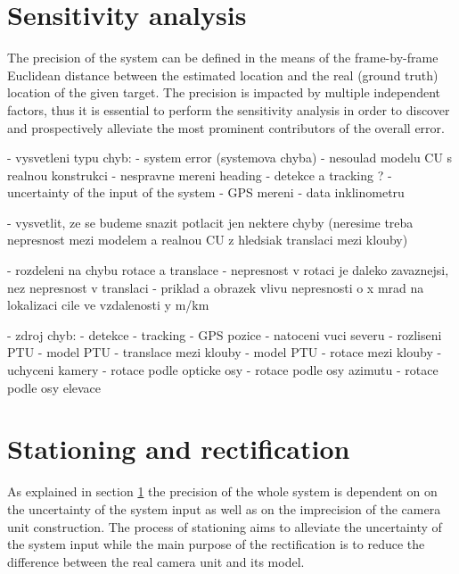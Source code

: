 \chapter{Sensitivity analysis} \label{txt:sensitivity_analysis}
The precision of the system can be defined in the means of the frame-by-frame Euclidean distance between the estimated location and the real (ground truth) location of the given target. The precision is impacted by multiple independent factors, thus it is essential to perform the sensitivity analysis in order to discover and prospectively alleviate the most prominent contributors of the overall error. 

- vysvetleni typu chyb:
	- system error (systemova chyba)
		- nesoulad modelu CU s realnou konstrukci
		- nespravne mereni heading
		- detekce a tracking ?
	- uncertainty of the input of the system
		- GPS mereni
		- data inklinometru
	
- vysvetlit, ze se budeme snazit potlacit jen nektere chyby (neresime treba nepresnost mezi modelem a realnou CU z hledsiak translaci mezi klouby)

- rozdeleni na chybu rotace a translace
	- nepresnost v rotaci je daleko zavaznejsi, nez nepresnost v translaci
	- priklad a obrazek vlivu nepresnosti o x mrad na lokalizaci cile ve vzdalenosti y m/km

- zdroj chyb:
	- detekce
	- tracking
	- GPS pozice
	- natoceni vuci severu
	- rozliseni PTU
	- model PTU - translace mezi klouby
	- model PTU - rotace mezi klouby
	- uchyceni kamery
		- rotace podle opticke osy
		- rotace podle osy azimutu
		- rotace podle osy elevace
		

\chapter{Stationing and rectification} \label{txt:stationing_and_rectification}

As explained in section \ref{txt:sensitivity_analysis} the precision of the whole system is dependent on on the uncertainty of the system input as well as on the imprecision of the camera unit construction. The process of stationing aims to alleviate the uncertainty of the system input while the main purpose of the rectification is to reduce the difference between the real camera unit and its model.


